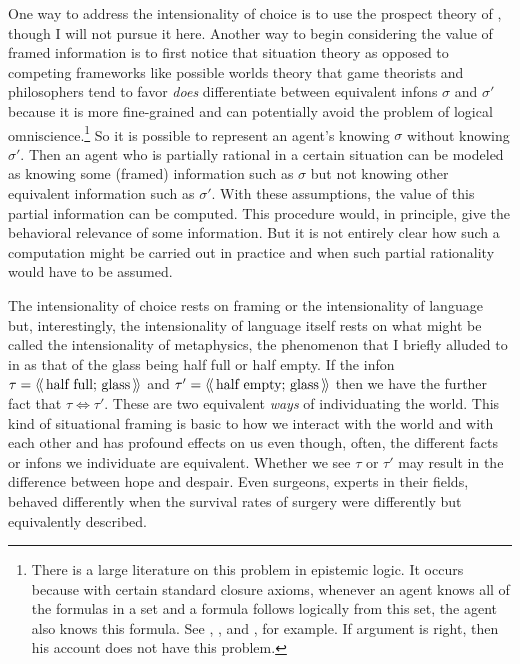 One way to address the intensionality of choice is to use the prospect theory of \citet{kt:pt}, though I will not pursue it here. Another way to begin considering the value of framed information is to first notice that situation theory as opposed to competing frameworks like possible worlds theory that game theorists and philosophers tend to favor \emph{does} differentiate between equivalent infons $\sigma$ and $\sigma'$ because it is more fine-grained and can potentially avoid the problem of logical omniscience.\footnote{There is a large literature on this problem in epistemic logic. It occurs because with certain standard closure axioms, whenever an agent knows all of the formulas in a set and a formula follows logically from this set, the agent also knows this formula. See \citet{HendricksSymons2015}, \citet[Chapter~9]{fhmv:rk}, and \citet{stalnaker:ploI}, for example. If  argument is right, then his account does not have this problem.} So it is possible to represent an agent's knowing $\sigma$ without knowing $\sigma'$. Then an agent who is partially rational in a certain situation can be modeled as knowing some (framed) information such as $\sigma$ but not knowing other equivalent information such as $\sigma'$. With these assumptions, the value of this partial information can be computed. This procedure would, in principle, give the behavioral relevance of some information. But it is not entirely clear how such a computation might be carried out in practice and when such partial rationality would have to be assumed.

The intensionality of choice rests on framing or the intensionality of language but, interestingly, the intensionality of language itself rests on what might be called the intensionality of metaphysics, the phenomenon that I briefly alluded to in  as that of the glass being half full or half empty. If the infon $\tau = \langle\!\langle\,\hbox{half full; glass}\,\rangle\!\rangle$ and $\tau' = \langle\!\langle\,\hbox{half empty; glass}\,\rangle\!\rangle$ then we have the further fact that $\tau \Longleftrightarrow \tau'$. These are two equivalent \emph{ways} of individuating the world. This kind of situational framing is basic to how we interact with the world and with each other and has profound effects on us even though, often, the different facts or infons we individuate are equivalent. Whether we see $\tau$ or $\tau'$ may result in the difference between hope and despair. Even surgeons, experts in their fields, behaved differently when the survival rates of surgery were differently but equivalently described.

